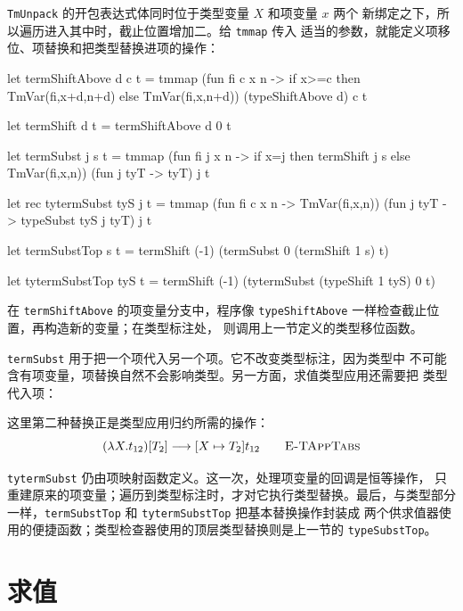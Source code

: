 \texttt{TmUnpack} 的开包表达式体同时位于类型变量 \(X\) 和项变量 \(x\) 两个
新绑定之下，所以遍历进入其中时，截止位置增加二。给 \texttt{tmmap} 传入
适当的参数，就能定义项移位、项替换和把类型替换进项的操作：
\begin{taplocamlcode}
let termShiftAbove d c t =
  tmmap
    (fun fi c x n ->
      if x>=c then TmVar(fi,x+d,n+d) else TmVar(fi,x,n+d))
    (typeShiftAbove d)
    c t

let termShift d t = termShiftAbove d 0 t

let termSubst j s t =
  tmmap
    (fun fi j x n ->
      if x=j then termShift j s else TmVar(fi,x,n))
    (fun j tyT -> tyT)
    j t

let rec tytermSubst tyS j t =
  tmmap
    (fun fi c x n -> TmVar(fi,x,n))
    (fun j tyT -> typeSubst tyS j tyT)
    j t

let termSubstTop s t =
  termShift (-1) (termSubst 0 (termShift 1 s) t)

let tytermSubstTop tyS t =
  termShift (-1) (tytermSubst (typeShift 1 tyS) 0 t)
\end{taplocamlcode}

在 \texttt{termShiftAbove} 的项变量分支中，程序像
\texttt{typeShiftAbove} 一样检查截止位置，再构造新的变量；在类型标注处，
则调用上一节定义的类型移位函数。

\texttt{termSubst} 用于把一个项代入另一个项。它不改变类型标注，因为类型中
不可能含有项变量，项替换自然不会影响类型。另一方面，求值类型应用还需要把
类型代入项：

这里第二种替换正是类型应用归约所需的操作：
\[
(\lambda X.t_{12})[T_2]\longrightarrow[X\mapsto T_2]t_{12}
\qquad\textsc{E-TAppTabs}
\]

\texttt{tytermSubst} 仍由项映射函数定义。这一次，处理项变量的回调是恒等操作，
只重建原来的项变量；遍历到类型标注时，才对它执行类型替换。最后，与类型部分
一样，\texttt{termSubstTop} 和 \texttt{tytermSubstTop} 把基本替换操作封装成
两个供求值器使用的便捷函数；类型检查器使用的顶层类型替换则是上一节的
\texttt{typeSubstTop}。

\section{求值}
\label{sec:25.4}

